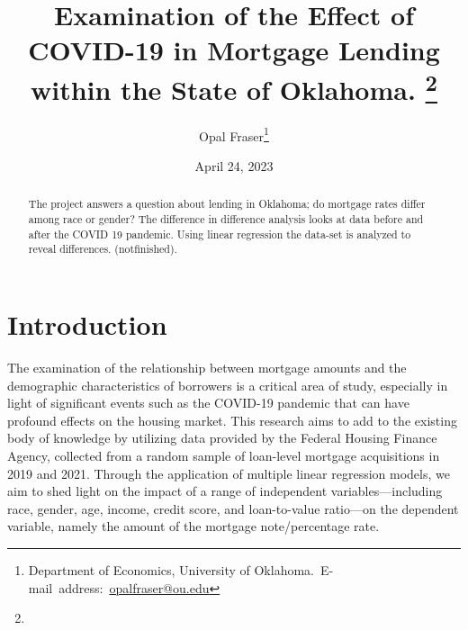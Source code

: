 \documentclass[12pt,english]{article}
\begin{document}
\begin{singlespace}
\title{Examination of the Effect of COVID-19 in Mortgage Lending within the State of Oklahoma. \thanks{}}
\end{singlespace}

\author{Opal Fraser\thanks{Department of Economics, University of Oklahoma.\
E-mail~address:~\href{mailto:opalfraser@ou.edu}{opalfraser@ou.edu}}}

\date{April 24, 2023}

\maketitle

\begin{abstract}
\begin{singlespace}
The project answers a question about lending in Oklahoma; do mortgage rates differ among race or gender? The difference in difference analysis looks at data before and after the COVID 19 pandemic. Using linear regression the data-set is analyzed to reveal differences. (notfinished). 

\end{singlespace}

\end{abstract}
\vfill{}

\pagebreak{}

\section{Introduction}\label{sec:intro}

The examination of the relationship between mortgage amounts and the demographic characteristics of borrowers is a critical area of study, especially in light of significant events such as the COVID-19 pandemic that can have profound effects on the housing market. This research aims to add to the existing body of knowledge by utilizing data provided by the Federal Housing Finance Agency, collected from a random sample of loan-level mortgage acquisitions in 2019 and 2021. Through the application of multiple linear regression models, we aim to shed light on the impact of a range of independent variables—including race, gender, age, income, credit score, and loan-to-value ratio—on the dependent variable, namely the amount of the mortgage note/percentage rate. 
\end{document}
